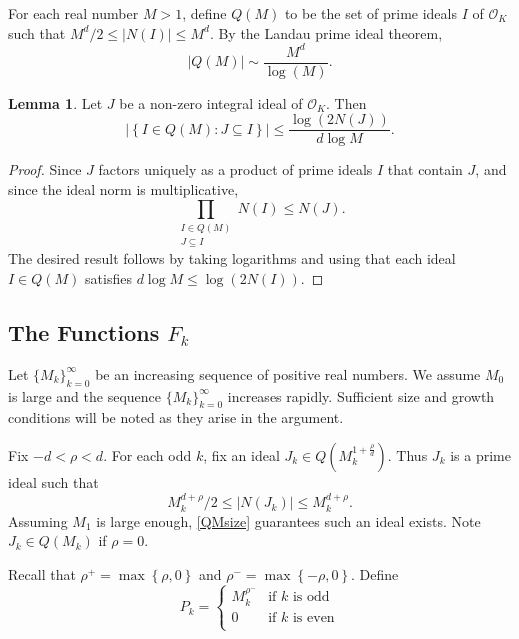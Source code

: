 \documentclass{amsart}
\numberwithin{equation}{section}
\theoremstyle{definition}
\newtheorem{lemma}[theorem]{Lemma}
\theoremstyle{definition}
\def\P{P}
\newcommand{\cbr}[1]{ \left\{ {#1} \right\} }
\newcommand{\OK}{\mathcal{O}_K}
\begin{document}
For each real number $M > 1$, 
define $Q(M)$ to be the set of prime ideals $I$ of $\OK$ such that $M^d/2 \leq |N(I)| \leq M^d$. 
By the Landau prime ideal theorem, 
\begin{equation}\label{QMsize}
|Q(M)| \sim \frac{M^d}{\log(M)}.
\end{equation}


\begin{lemma}\label{primedivisorbound}
Let $J$ be a non-zero integral ideal of $\OK$. Then 
\begin{equation}\label{primedivisorineq}
|\cbr{I \in Q(M): J \subseteq I}| \leq \frac{\log (2N(J))}{d \log M}.
\end{equation}
\end{lemma}
\begin{proof}
Since $J$ factors uniquely as a product of prime ideals $I$ that contain $J$, and since the ideal norm is multiplicative, 
\[\prod_{\substack{I \in Q(M) \\ J \subseteq I}} N(I) \leq 
N(J).\] 
The desired result follows by taking logarithms and using that each ideal $I \in Q(M)$ satisfies $d\log M \leq \log (2N(I))$. 
\end{proof}







\subsection{The Functions \texorpdfstring{$F_k$}{Fk}}

Let $\{M_k\}_{k=0}^{\infty}$ 
be an increasing sequence of positive real numbers. We assume $M_0$ is large 
and the sequence $\{M_k\}_{k=0}^{\infty}$ increases rapidly. Sufficient size and growth conditions will be noted as they arise in the argument. 

Fix $-d < \rho < d$. For each odd $k$, fix an ideal $J_k \in Q(M_k^{1+\frac{\rho}{d}})$. Thus $J_k$ is a prime ideal  
such that 
$$M_k^{d+\rho}/2 \leq |N(J_k)| \leq M_k^{d+\rho}.$$ 
Assuming $M_1$ is large enough, \eqref{QMsize} guarantees such an ideal exists. Note $J_k \in Q(M_k)$ if $\rho = 0$. 
%

Recall that $\rho^{+}=\max\cbr{\rho,0}$ and 
$\rho^{-}=\max\cbr{-\rho,0}$. 
Define 
$$
\P_k = 
\left\{
\begin{array}{ll}
M_k^{\rho^-}
& \text{if } k \text{ is odd} \\
0 & \text{if } k \text{ is even} \\
\end{array}
\right.
$$
%
\end{document}
